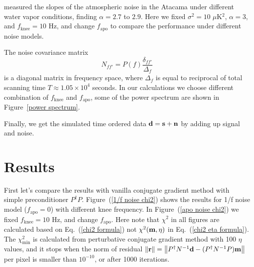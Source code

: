 \documentclass[twocolumn,linenumbers]{aastex631}
\newcommand{\vbd}{\vb{d}}
\newcommand{\vbm}{\vb{m}}
\newcommand{\inv}[1]{#1^{-1}}
\newcommand{\Pdagger}{P^{\dagger}}
\begin{document}
\citet{2013ApJ...762...10D} measured the slopes of the atmospheric noise in the Atacama under different water vapor conditions, finding $\alpha = 2.7$ to $2.9$.
Here we fixed $\sigma^2 = 10$ $\mu$K$^2$, $\alpha=3$, and $f_{\text{knee}} = 10$ Hz,
and change $f_{\text{apo}}$ to compare the performance under different noise
models.

The noise covariance matrix 
\begin{equation}
N_{ff'} = P(f) \frac{\delta_{ff'}}{\Delta_f}
\label{noise covariance matrix}
\end{equation}
is a diagonal matrix in frequency space, where $\Delta_f$ is equal to reciprocal
of total scanning time $T \approx 1.05\times 10^{4}$ seconds.
In our calculations we choose different combination of $f_\text{knee}$ and $f_\text{apo}$,
some of the power spectrum are shown in Figure~\ref{power spectrum}.

Finally, we get the simulated time ordered data $\vb{d} = \vb{s} + \vb{n}$ by
adding up signal and noise.



\section{Results} \label{sec:results}



First let's compare the results with vanilla conjugate gradient method with
simple preconditioner $\Pdagger P$.
Figure~(\ref{1/f noise chi2}) shows the results for 1/f noise model ($f_\text{apo}=0$)
with different knee frequency. 
In Figure~(\ref{apo noise chi2}) we fixed $f_\text{knee}=10$ Hz, and change $f_\text{apo}$.
Here note that $\chi^2$ in all figures are calculated based on
Eq.~(\ref{chi2 formula})
not $\chi^2(\vbm, \eta)$ in Eq.~(\ref{chi2 eta formula}).
The $\chi^2_{\text{min}}$ is calculated from perturbative conjugate gradient
method with 100 $\eta$ values, and it stops when the norm of residual 
$\norm{\vb{r}} = \norm{\Pdagger \inv{N}\vbd - (\Pdagger\inv{N}P) \vbm}$
per pixel is smaller than $10^{-10}$, or after 1000 iterations.
\end{document}
